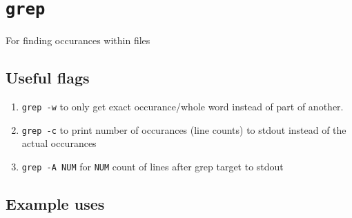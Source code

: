     
    \maketitle
    
    

    
    \section{\texorpdfstring{\texttt{grep}}{grep}}\label{grep}

For finding occurances within files

    \subsection{Useful flags}\label{useful-flags}

\begin{enumerate}
\def\labelenumi{\arabic{enumi}.}
\item
  \texttt{grep\ -w} to only get exact occurance/whole word instead of
  part of another.
\item
  \texttt{grep\ -c} to print number of occurances (line counts) to
  stdout instead of the actual occurances
\item
  \texttt{grep\ -A\ NUM} for \texttt{NUM} count of lines after grep
  target to stdout
\end{enumerate}

    \subsection{Example uses}\label{example-uses}

    \begin{Shaded}
\begin{Highlighting}[]
\ExtensionTok{$}\KeywordTok{|}  \KeywordTok{|} 

\end{Highlighting}
\end{Shaded}

    \begin{Shaded}
\begin{Highlighting}[]
\ExtensionTok{$}\KeywordTok{|}  \KeywordTok{|}  

\end{Highlighting}
\end{Shaded}

